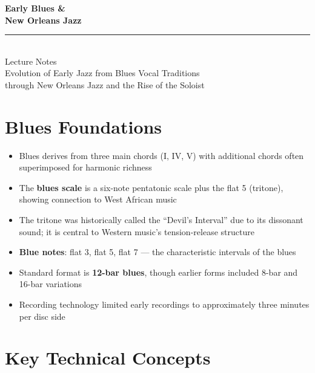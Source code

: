 \documentclass[11pt, letterpaper]{article}
\begin{document}
\thispagestyle{empty}
\begin{center}
    \vspace*{1cm}
    {\Huge\bfseries\color{accent} Early Blues \&\\[0.3em] New Orleans Jazz}\\[1.5em]
    \textcolor{rulecolor}{\rule{0.6\textwidth}{0.8pt}}\\[1em]
    {\large Lecture Notes}\\[0.5em]
    {\color{gray}\small Evolution of Early Jazz from Blues Vocal Traditions\\through New Orleans Jazz and the Rise of the Soloist}
    \vspace{1.5cm}
\end{center}

\tableofcontents
\newpage

\section{Blues Foundations}

\begin{itemize}
    \item Blues derives from three main chords (I, IV, V) with additional chords often superimposed for harmonic richness
    \item The \textbf{blues scale} is a six-note pentatonic scale plus the flat 5 (tritone), showing connection to West African music
    \item The tritone was historically called the ``Devil's Interval'' due to its dissonant sound; it is central to Western music's tension-release structure
    \item \textbf{Blue notes}: flat 3, flat 5, flat 7 --- the characteristic intervals of the blues
    \item Standard format is \textbf{12-bar blues}, though earlier forms included 8-bar and 16-bar variations
    \item Recording technology limited early recordings to approximately three minutes per disc side
\end{itemize}

\section{Key Technical Concepts}
\end{document}
